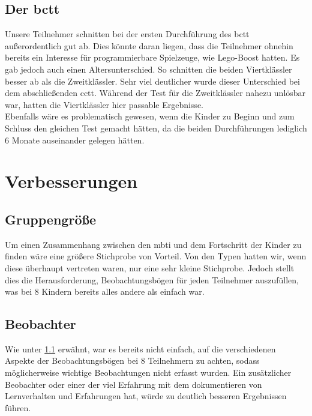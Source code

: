 \subsection{Der \acrlong{bctt}} \label{problemCTT}
Unsere Teilnehmer schnitten bei der ersten Durchführung des \acrshort{bctt} außerordentlich gut ab. Dies könnte daran liegen, dass die Teilnehmer ohnehin bereits ein Interesse für programmierbare Spielzeuge, wie \gls{Lego}-Boost hatten. Es gab jedoch auch einen Altersunterschied. So schnitten die beiden Viertklässler besser ab als die Zweitklässler. Sehr viel deutlicher wurde dieser Unterschied bei dem abschließenden \acrshort{cctt}. Während der Test für die Zweitklässler nahezu unlösbar war, hatten die Viertklässler hier passable Ergebnisse.\\
Ebenfalls wäre es problematisch gewesen, wenn die Kinder zu Beginn und zum Schluss den gleichen Test gemacht hätten, da die beiden Durchführungen lediglich 6 Monate auseinander gelegen hätten.


\section{Verbesserungen}
\subsection{Gruppengröße}\label{size}
Um einen Zusammenhang zwischen den \acrlong{mbti} und dem Fortschritt der Kinder zu finden wäre eine größere Stichprobe von Vorteil. Von den Typen hatten wir, wenn diese überhaupt vertreten waren, nur eine sehr kleine Stichprobe. Jedoch stellt dies die Herausforderung, Beobachtungsbögen für jeden Teilnehmer auszufüllen, was bei 8 Kindern bereits alles andere als einfach war.

\subsection{Beobachter}
Wie unter \ref{size} erwähnt, war es bereits nicht einfach, auf die verschiedenen Aspekte der Beobachtungsbögen bei 8 Teilnehmern zu achten, sodass möglicherweise wichtige Beobachtungen nicht erfasst wurden. Ein zusätzlicher Beobachter oder einer der viel Erfahrung mit dem dokumentieren von Lernverhalten und Erfahrungen hat, würde zu deutlich besseren Ergebnissen führen.

